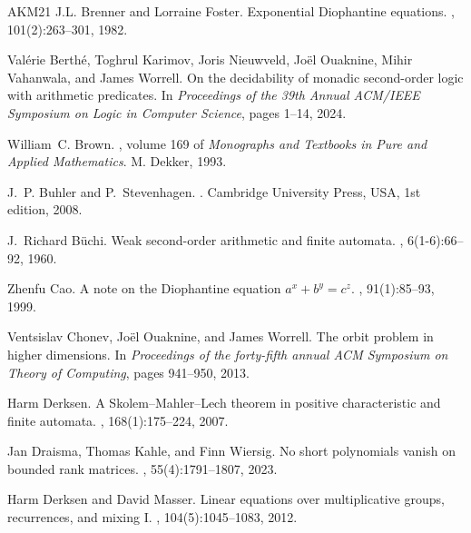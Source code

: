 \documentclass[letterpaper, 11pt, thm-restate]{article}
\numberwithin{equation}{section}
\theoremstyle{definition}
\theoremstyle{definition}
\theoremstyle{definition}
\begin{document}
\begin{thebibliography}{AKM{\etalchar{+}}21}
J.L. Brenner and Lorraine Foster.
\newblock Exponential {D}iophantine equations.
, 101(2):263--301, 1982.

Val{\'e}rie Berth{\'e}, Toghrul Karimov, Joris Nieuwveld, Jo{\"e}l Ouaknine, Mihir Vahanwala, and James Worrell.
\newblock On the decidability of monadic second-order logic with arithmetic predicates.
\newblock In {\em Proceedings of the 39th Annual ACM/IEEE Symposium on Logic in Computer Science}, pages 1--14, 2024.

William~C. Brown.
, volume 169 of {\em Monographs and Textbooks in Pure and Applied Mathematics}.
\newblock M. Dekker, 1993.

J.~P. Buhler and P.~Stevenhagen.
.
\newblock Cambridge University Press, USA, 1st edition, 2008.

J.~Richard Büchi.
\newblock Weak second-order arithmetic and finite automata.
, 6(1-6):66--92, 1960.

Zhenfu Cao.
\newblock A note on the {D}iophantine equation $a^x + b^y= c^z$.
, 91(1):85--93, 1999.

Ventsislav Chonev, Jo{\"e}l Ouaknine, and James Worrell.
\newblock The orbit problem in higher dimensions.
\newblock In {\em Proceedings of the forty-fifth annual ACM Symposium on Theory of Computing}, pages 941--950, 2013.

Harm Derksen.
\newblock A {S}kolem--{M}ahler--{L}ech theorem in positive characteristic and finite automata.
, 168(1):175--224, 2007.

Jan Draisma, Thomas Kahle, and Finn Wiersig.
\newblock No short polynomials vanish on bounded rank matrices.
, 55(4):1791--1807, 2023.

Harm Derksen and David Masser.
\newblock Linear equations over multiplicative groups, recurrences, and mixing {I}.
, 104(5):1045--1083, 2012.


\end{thebibliography}
\end{document}
